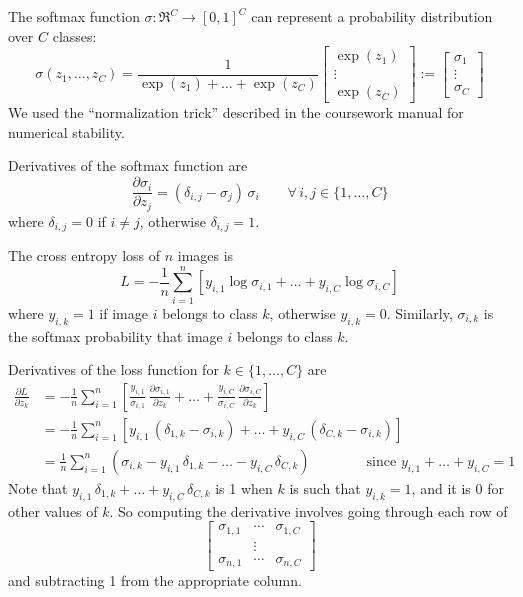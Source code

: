 \documentclass[12pt, a4paper]{article}
\begin{document}
The softmax function $\sigma : \Re^C \rightarrow [0, 1]^C$ can represent a probability distribution over $C$ classes:
\[ \sigma(z_1, \dots, z_C) = \frac{1}{\exp(z_1) + \dots + \exp(z_C)}
   \begin{bmatrix} \exp(z_1) \\ \vdots \\ \exp(z_C) \end{bmatrix} :=
   \begin{bmatrix} \sigma_1  \\ \vdots \\ \sigma_C  \end{bmatrix} \]
We used the ``normalization trick'' described in the coursework manual for numerical stability.\par
\bigskip
Derivatives of the softmax function are
\[ \frac{\partial \sigma_i}{\partial z_j} = (\delta_{i,j} - \sigma_j) \, \sigma_i \qquad \forall \, i, j \in \{1, \dots, C\} \]
where $\delta_{i,j} = 0$ if $i \neq j$, otherwise $\delta_{i,j} = 1$.\par
\bigskip
The cross entropy loss of $n$ images is
\[ L = -\frac1n \sum_{i=1}^n \left[ y_{i,1} \log \sigma_{i,1} + \dots + y_{i,C} \log \sigma_{i,C} \right] \]
where $y_{i,k} = 1$ if image $i$ belongs to class $k$, otherwise $y_{i,k} = 0$. Similarly, $\sigma_{i,k}$ is the softmax probability that image $i$ belongs to class $k$.\par
\bigskip
Derivatives of the loss function for $k \in \{1, \dots, C\}$ are
\begin{align*}
    \frac{\partial L}{\partial z_k}
    &= -\frac1n \sum_{i=1}^n \left[ \frac{y_{i,1}}{\sigma_{i,1}} \, \frac{\partial \sigma_{i,1}}{\partial z_k} + \dots + \frac{y_{i,C}}{\sigma_{i,C}} \, \frac{\partial \sigma_{i,C}}{\partial z_k} \right] \\
    &= -\frac1n \sum_{i=1}^n \left[ y_{i,1} \, (\delta_{1,k} - \sigma_{i,k}) + \dots + y_{i,C} \, (\delta_{C,k} - \sigma_{i,k}) \right] \\
    &= \frac1n \sum_{i=1}^n \left( \sigma_{i,k} - y_{i,1} \, \delta_{1,k} - \dots - y_{i,C} \, \delta_{C,k} \right) \qquad \qquad \text{since } y_{i,1} + \dots + y_{i,C} = 1
\end{align*}
Note that $y_{i,1} \, \delta_{1,k} + \dots + y_{i,C} \, \delta_{C,k}$ is 1 when $k$ is such that $y_{i,k} = 1$, and it is 0 for other values of $k$. So computing the derivative involves going through each row of
\[ \begin{bmatrix}
   \sigma_{1,1} & \dotsm & \sigma_{1,C} \\
   & \vdots & \\
   \sigma_{n,1} & \dotsm & \sigma_{n,C}
   \end{bmatrix} \]
and subtracting 1 from the appropriate column.
\end{document}
